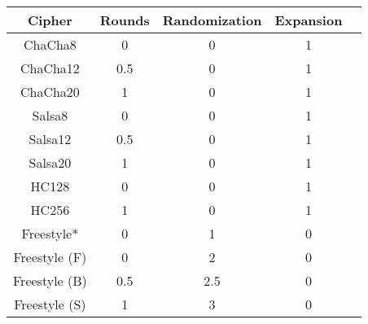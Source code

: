 \begin{table}[t]
    \begin{center}
        \small
        \centering
        \begin{tabular}{@{}c|cccc@{}}
            \textbf{Cipher} & \textbf{Rounds} & \textbf{Randomization} & \textbf{Expansion} \\
            \midrule
            ChaCha8         & 0           & 0           & 1           \\
            ChaCha12        & 0.5         & 0           & 1           \\
            ChaCha20        & 1           & 0           & 1           \\
            Salsa8          & 0           & 0           & 1           \\
            Salsa12         & 0.5         & 0           & 1           \\
            Salsa20         & 1           & 0           & 1           \\
            HC128           & 0           & 0           & 1           \\
            HC256           & 1           & 0           & 1           \\
            Freestyle*      & 0           & 1           & 0           \\
            Freestyle (F)   & 0           & 2           & 0           \\
            Freestyle (B)   & 0.5         & 2.5         & 0           \\
            Freestyle (S)   & 1           & 3           & 0           \\
        \end{tabular}
    \end{center}

\end{table}

